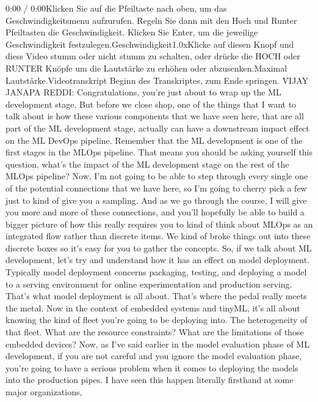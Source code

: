 {{    0:00 / 0:00Klicken Sie auf die Pfeiltaste nach oben, um das Geschwindigkeitsmenu aufzurufen. Regeln Sie dann mit den Hoch und Runter Pfeiltasten die Geschwindigkeit. Klicken Sie Enter, um die jeweilige Geschwindigkeit festzulegen.Geschwindigkeit1.0xKlicke auf diesen Knopf und diess Video stumm oder nicht stumm zu schalten, oder drücke die HOCH oder RUNTER Knöpfe um die Lautstärke zu erhöhen oder abzusenken.Maximal Lautstärke.Videotranskript
    Beginn des Transkriptes, zum Ende springen.
    VIJAY JANAPA REDDI: Congratulations, you're
    just about to wrap up the ML development stage.
    But before we close shop, one of the things that I want to talk about
    is how these various components that we have seen here,
    that are all part of the ML development stage,
    actually can have a downstream impact effect on the ML DevOps pipeline.
    Remember that the ML development is one of the first stages in the MLOps
    pipeline.
    That means you should be asking yourself this question,
    what's the impact of the ML development stage
    on the rest of the MLOps pipeline?
    Now, I'm not going to be able to step through every single one
    of the potential connections that we have here,
    so I'm going to cherry pick a few just to kind of give you a sampling.
    And as we go through the course, I will give you
    more and more of these connections, and you'll hopefully
    be able to build a bigger picture of how this really
    requires you to kind of think about MLOps as an integrated flow rather
    than discrete items.
    We kind of broke things out into these discrete boxes so it's easy for you
    to gather the concepts.
    So, if we talk about ML development, let's try and understand
    how it has an effect on model deployment.
    Typically model deployment concerns packaging, testing,
    and deploying a model to a serving environment for online experimentation
    and production serving.
    That's what model deployment is all about.
    That's where the pedal really meets the metal.
    Now in the context of embedded systems and tinyML,
    it's all about knowing the kind of fleet you're going to be deploying into.
    The heterogeneity of that fleet.
    What are the resource constraints?
    What are the limitations of those embedded devices?
    Now, as I've said earlier in the model evaluation phase of ML development,
    if you are not careful and you ignore the model evaluation phase,
    you're going to have a serious problem when
    it comes to deploying the models into the production pipes.
    I have seen this happen literally firsthand at some major organizations,
}}
